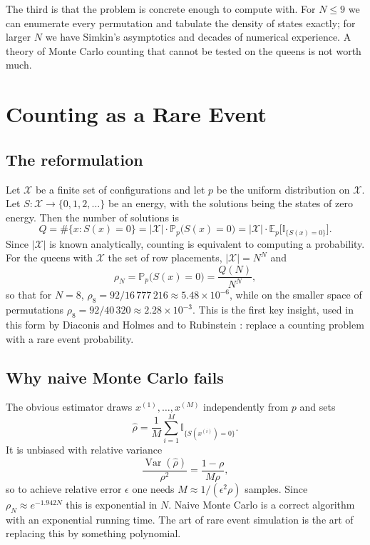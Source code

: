 \documentclass[11pt,twoside,openany]{book}
\theoremstyle{plain}
\theoremstyle{definition}
\theoremstyle{remark}
\newcommand{\PP}{\mathbb{P}}
\newcommand{\EE}{\mathbb{E}}
\newcommand{\Ind}{\mathbb{I}}
\newcommand{\cX}{\mathcal{X}}
\DeclareMathOperator{\Var}{Var}
\begin{document}
The third is that the problem is concrete enough to compute with. For $N \le 9$ we can enumerate every permutation and tabulate the density of states exactly; for larger $N$ we have Simkin's asymptotics and decades of numerical experience. A theory of Monte Carlo counting that cannot be tested on the queens is not worth much.

\chapter{Counting as a Rare Event}
\label{ch:rare}

\section{The reformulation}

Let $\cX$ be a finite set of configurations and let $p$ be the uniform distribution on $\cX$. Let $S: \cX \to \{0, 1, 2, \dots\}$ be an energy, with the solutions being the states of zero energy. Then the number of solutions is
\[
Q = \#\{x : S(x) = 0\} = |\cX| \cdot \PP_p\big( S(x) = 0 \big) = |\cX| \cdot \EE_p\big[ \Ind_{\{S(x) = 0\}} \big] .
\]
Since $|\cX|$ is known analytically, counting is equivalent to computing a probability. For the queens with $\cX$ the set of row placements, $|\cX| = N^N$ and
\[
\rho_N = \PP_p\big( S(x) = 0 \big) = \frac{Q(N)}{N^N} ,
\]
so that for $N = 8$, $\rho_8 = 92 / 16\,777\,216 \approx 5.48 \times 10^{-6}$, while on the smaller space of permutations $\rho_8 = 92 / 40\,320 \approx 2.28 \times 10^{-3}$. This is the first key insight, used in this form by Diaconis and Holmes \cite{DiaconisHolmes} and to Rubinstein \cite{Rubinstein2006}: replace a counting problem with a rare event probability.

\section{Why naive Monte Carlo fails}

The obvious estimator draws $x^{(1)}, \dots, x^{(M)}$ independently from $p$ and sets
\[
\hat\rho = \frac{1}{M} \sum_{i=1}^{M} \Ind_{\{S(x^{(i)}) = 0\}} .
\]
It is unbiased with relative variance
\[
\frac{\Var(\hat\rho)}{\rho^2} = \frac{1 - \rho}{M \rho} ,
\]
so to achieve relative error $\epsilon$ one needs $M \approx 1/(\epsilon^2 \rho)$ samples. Since $\rho_N \approx e^{-1.942 N}$ this is exponential in $N$. Naive Monte Carlo is a correct algorithm with an exponential running time. The art of rare event simulation is the art of replacing this by something polynomial.
\end{document}

